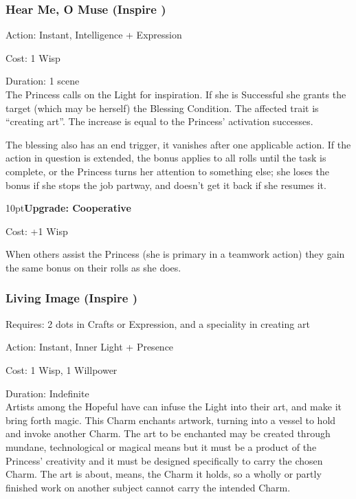 \subsubsection*{Hear Me, O Muse (Inspire \textbullet)}

\noindent Action: Instant, Intelligence + Expression

\noindent Cost: 1 Wisp

\noindent Duration: 1 scene \\

\noindent The Princess calls on the Light for inspiration. If she is Successful she grants the target (which may be herself) the Blessing Condition. The affected trait is \textquotedblleft creating art\textquotedblright. The increase is equal to the Princess' activation successes. 

The blessing also has an end trigger, it vanishes after one applicable action. If the action in question is extended, the bonus applies to all rolls until the task is complete, or the Princess turns her attention to something else; she loses the bonus if she stops the job partway, and doesn't get it back if she resumes it.

\begin{myindentpar}{10pt}\textbf{Upgrade: Cooperative}

\noindent Cost: +1 Wisp

When others assist the Princess (she is primary in a teamwork action) they gain the same bonus on their rolls as she does.\end{myindentpar}


\subsubsection*{Living Image (Inspire \textbullet)}

\noindent Requires: 2 dots in Crafts or Expression, and a speciality in creating art

\noindent Action: Instant, Inner Light + Presence 

\noindent Cost: 1 Wisp, 1 Willpower

\noindent Duration: Indefinite\\

\noindent Artists among the Hopeful have can infuse the Light into their art, and make it bring forth magic. This Charm enchants artwork, turning into a vessel to hold and invoke another Charm. The art to be enchanted may be created through mundane, technological or magical means but it must be a product of the Princess' creativity and it must be designed specifically to carry the chosen Charm. The art is about, means, the Charm it holds, so a wholly or partly finished work on another subject cannot carry the intended Charm.

